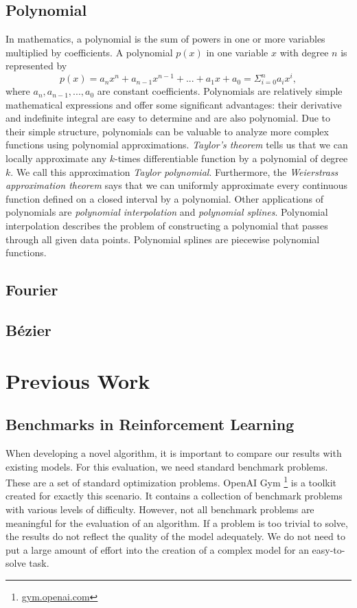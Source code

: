 \subsection{Polynomial}
In mathematics, a polynomial is the sum of powers in one or more variables multiplied by coefficients. A polynomial $p(x)$ in one variable $x$ with degree $n$ is represented by
\[
	p(x) = a_n x^n + a_{n-1} x^{n-1} + ... + a_1 x + a_0 = \Sigma^n_{i=0} a_i x^i,
\]
where $a_n, a_{n-1}, ..., a_0$ are constant coefficients. Polynomials are relatively simple mathematical expressions and offer some significant advantages: their derivative and indefinite integral are easy to determine and are also polynomial. Due to their simple structure, polynomials can be valuable to analyze more complex functions using polynomial approximations. \textit{Taylor's theorem} tells us that we can locally approximate any $k$-times differentiable function by a polynomial of degree $k$. We call this approximation \textit{Taylor polynomial}. Furthermore, the \textit{Weierstrass approximation theorem} says that we can uniformly approximate every continuous function defined on a closed interval by a polynomial. Other applications of polynomials are \textit{polynomial interpolation} and \textit{polynomial splines}. Polynomial interpolation describes the problem of constructing a polynomial that passes through all given data points. Polynomial splines are piecewise polynomial functions.


\subsection{Fourier}

\subsection{Bézier}


\section{Previous Work}

\subsection{Benchmarks in Reinforcement Learning}
When developing a novel algorithm, it is important to compare our results with existing models. For this evaluation, we need standard benchmark problems. These are a set of standard optimization problems. OpenAI Gym \footnote{\url{gym.openai.com}} is a toolkit created for exactly this scenario. It contains a collection of benchmark problems with various levels of difficulty. However, not all benchmark problems are meaningful for the evaluation of an algorithm. If a problem is too trivial to solve, the results do not reflect the quality of the model adequately. We do not need to put a large amount of effort into the creation of a complex model for an easy-to-solve task.

